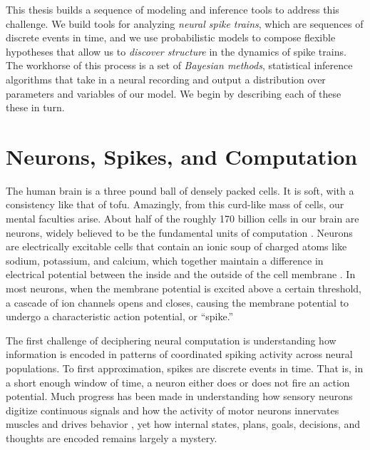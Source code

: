 This thesis builds a sequence of modeling and inference tools to
address this challenge. We build tools for analyzing \emph{neural spike
  trains}, which are sequences of discrete events in time, and we use
probabilistic models to compose flexible hypotheses that allow us to
\emph{discover structure} in the dynamics of spike trains.  The
workhorse of this process is a set of \emph{Bayesian methods},
statistical inference algorithms that take in a neural recording and
output a distribution over parameters and variables of our model.  We
begin by describing each of these these in turn.


\section{Neurons, Spikes, and Computation}
The human brain is a three pound ball of densely packed cells.  It is
soft, with a consistency like that of tofu.  Amazingly, from this
curd-like mass of cells, our mental faculties arise.  About half of
the roughly 170 billion cells in our brain are neurons, widely
believed to be the fundamental units of computation
\citep{DayanAbbott}.  Neurons are electrically excitable cells that
contain an ionic soup of charged atoms like sodium, potassium, and
calcium, which together maintain a difference in electrical potential
between the inside and the outside of the cell membrane
\citep{kandel2000principles}. In most neurons, when the membrane potential is excited
above a certain threshold, a cascade of ion channels opens and closes,
causing the membrane potential to undergo a characteristic action
potential, or ``spike.''

The first challenge of deciphering neural computation is understanding
how information is encoded in patterns of coordinated spiking activity
across neural populations. To first approximation, spikes are
discrete events in time.  That is, in a short enough
window of time, a neuron either does or does not fire an action
potential.  Much progress has been made in understanding how sensory
neurons digitize continuous signals and how the activity of motor
neurons innervates muscles and drives behavior \citep{rieke1999spikes}, yet how internal
states, plans, goals, decisions, and thoughts are encoded remains
largely a mystery.


